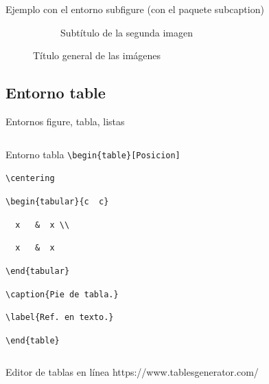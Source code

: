 \documentclass[aspectratio=169, 10pt]{beamer}
\begin{document}
\begin{frame}{Ejemplo con el entorno subfigure (con el paquete subcaption)}
\begin{figure}[H]
\begin{subfigure}{0.45\textwidth}
        \caption{Subtítulo de la segunda imagen}
        \label{fig:sub2}
    \end{subfigure}  
    \caption{Título general de las imágenes}
    \label{fig:general}
\end{figure}


\end{frame}



\subsection{Entorno table}
\begin{frame}[fragile]{Entornos figure, tabla, listas}
\begin{columns}
    \begin{column}{.48\linewidth}
    \begin{block}{Entorno tabla}
        \verb|\begin{table}[Posicion]|
        
        \hspace{4.5mm}    \verb|\centering|
            
        \hspace{8.5mm}    \verb|\begin{tabular}{c  c}| 
            
        \hspace{8.5mm}    \verb|  x   &  x \\    |
            
        \hspace{8.5mm}    \verb|  x   &  x       |
            
        \hspace{8.5mm}    \verb|\end{tabular}|
            
        \hspace{4.5mm}    \verb|\caption{Pie de tabla.}|
        
        \hspace{4.5mm}\verb|\label{Ref. en texto.}|
            
        \verb|\end{table}|

    \end{block}    
    \end{column}
\end{columns}
\pause
\begin{alertblock}{Editor de tablas en línea}
    https://www.tablesgenerator.com/
\end{alertblock}

\end{frame}
\end{document}
